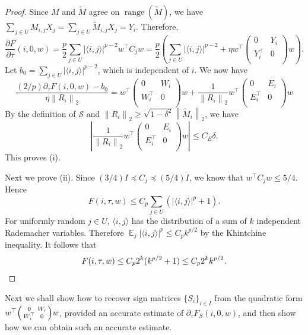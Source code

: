 \documentclass[11pt]{article}
\theoremstyle{remark}
\theoremstyle{definition}
\newcommand{\cS}{\mathcal{S}}
\newcommand{\ip}[2]{\langle #1,#2\rangle}
\newcommand{\norm}[1]{\left\|#1\right\|}
\DeclareMathOperator{\range}{range}
\DeclareMathOperator*{\E}{\mathbb{E}}
\begin{document}
\begin{proof}
	Since $M$ and $\widetilde{M}$ agree on $\range(\widetilde{M})$, we have
	$\sum_{j\in U} M_{i,j} X_j = \sum_{j\in U}\widetilde{M}_{i,j}X_j = Y_i$. Therefore,
	\[
		\frac{\partial F}{\partial \tau}(i,0,w)
		= \frac{p}{2}\sum_{j\in U}|\langle i,j\rangle|^{p-2} w^\top C_j w 
		= \frac{p}{2}\left( \sum_{j\in U}|\langle i,j\rangle|^{p-2} + \eta w^\top \begin{pmatrix}
			0 & Y_i \\	Y_i^\top & 0 \\
		\end{pmatrix} w \right).
	\]
	Let $b_0 = \sum_{j\in U} |\ip{i}{j}|^{p-2}$, which is independent of $i$. We now have
	\[
		\frac{(2/p)\partial_\tau F(i,0,w) - b_0}{\eta\norm{R_i}_2} = w^\top \begin{pmatrix}
			0 & W_i \\	W_i^\top & 0 \\
		\end{pmatrix} w + \frac{1}{\norm{R_i}_2}
		w^\top \begin{pmatrix}
			0 & E_i \\	E_i^\top & 0 \\
		\end{pmatrix} w
	\]
	By the definition of $\cS$ and $\norm{R_i}_2\geq \sqrt{1-\delta^2}\norm{\widetilde{M}_i}_2$, we have
	\[
		\left| \frac{1}{\norm{R_i}_2}
			w^\top \begin{pmatrix}
				0 & E_i \\	E_i^\top & 0 \\
			\end{pmatrix} w \right| \leq C_E\delta.
	\]
	This proves (i).
	
	Next we prove (ii). Since $(3/4)I \preceq C_j\preceq (5/4)I$, we know that $w^\top C_j w \leq 5/4$. Hence
	\[
		F(i,\tau,w) \leq C_p\sum_{j\in U}\left(|\ip{i}{j}|^p+1\right).
	\]
	For uniformly random $j\in U$, $\ip{i}{j}$ has the distribution of a sum of $k$ independent Rademacher variables. Therefore $\E_j|\ip{i}{j}|^p\leq C_p k^{p/2}$ by the Khintchine inequality. It follows that
	\[
		F(i,\tau,w) \leq C_p2^k(k^{p/2}+1) \leq C_p2^k k^{p/2}. \qedhere
	\]
\end{proof}

Next we shall show how to recover sign matrices $\{S_i\}_{i\in I}$ from the quadratic form $w^\top \begin{psmallmatrix}
	0 & W_i \\ W_i^\top & 0\\
\end{psmallmatrix} w$, provided an accurate estimate of $\partial_\tau F_S(i,0,w)$, and then show how we can obtain such an accurate estimate.
\end{document}
